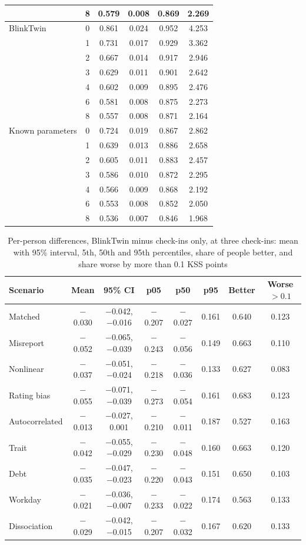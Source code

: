 \begin{table}[h]
\begin{tabular}{@{}lccccc@{}}
 & 8 & 0.579 & 0.008 & 0.869 & 2.269 \\
\midrule
BlinkTwin & 0 & 0.861 & 0.024 & 0.952 & 4.253 \\
 & 1 & 0.731 & 0.017 & 0.929 & 3.362 \\
 & 2 & 0.667 & 0.014 & 0.917 & 2.946 \\
 & 3 & 0.629 & 0.011 & 0.901 & 2.642 \\
 & 4 & 0.602 & 0.009 & 0.895 & 2.476 \\
 & 6 & 0.581 & 0.008 & 0.875 & 2.273 \\
 & 8 & 0.557 & 0.008 & 0.871 & 2.164 \\
\midrule
Known parameters & 0 & 0.724 & 0.019 & 0.867 & 2.862 \\
 & 1 & 0.639 & 0.013 & 0.886 & 2.658 \\
 & 2 & 0.605 & 0.011 & 0.883 & 2.457 \\
 & 3 & 0.586 & 0.010 & 0.872 & 2.295 \\
 & 4 & 0.566 & 0.009 & 0.868 & 2.192 \\
 & 6 & 0.553 & 0.008 & 0.852 & 2.050 \\
 & 8 & 0.536 & 0.007 & 0.846 & 1.968 \\
\bottomrule
  \end{tabular}
\end{table}

\begin{table}[t]
  \centering
  \caption{Per-person differences, BlinkTwin minus check-ins only, at three check-ins: mean with 95\% interval, 5th, 50th and 95th percentiles, share of people better, and share worse by more than 0.1 KSS points}
  \label{tab:appquantiles}
  \footnotesize
  \begin{tabular}{@{}lccccccc@{}}
\toprule
Scenario & Mean & 95\% CI & p05 & p50 & p95 & Better & Worse $>0.1$ \\
\midrule
Matched & $-$0.030 & $-$0.042, $-$0.016 & $-$0.207 & $-$0.027 & 0.161 & 0.640 & 0.123 \\
Misreport & $-$0.052 & $-$0.065, $-$0.039 & $-$0.243 & $-$0.056 & 0.149 & 0.663 & 0.110 \\
Nonlinear & $-$0.037 & $-$0.051, $-$0.024 & $-$0.218 & $-$0.036 & 0.133 & 0.627 & 0.083 \\
Rating bias & $-$0.055 & $-$0.071, $-$0.039 & $-$0.273 & $-$0.054 & 0.161 & 0.683 & 0.123 \\
Autocorrelated & $-$0.013 & $-$0.027, 0.001 & $-$0.210 & $-$0.011 & 0.187 & 0.527 & 0.163 \\
Trait & $-$0.042 & $-$0.055, $-$0.029 & $-$0.230 & $-$0.048 & 0.160 & 0.663 & 0.120 \\
Debt & $-$0.035 & $-$0.047, $-$0.023 & $-$0.220 & $-$0.043 & 0.151 & 0.650 & 0.103 \\
Workday & $-$0.021 & $-$0.036, $-$0.007 & $-$0.233 & $-$0.022 & 0.174 & 0.563 & 0.133 \\
Dissociation & $-$0.029 & $-$0.042, $-$0.015 & $-$0.207 & $-$0.032 & 0.167 & 0.620 & 0.133 \\
\bottomrule
  \end{tabular}
\end{table}

